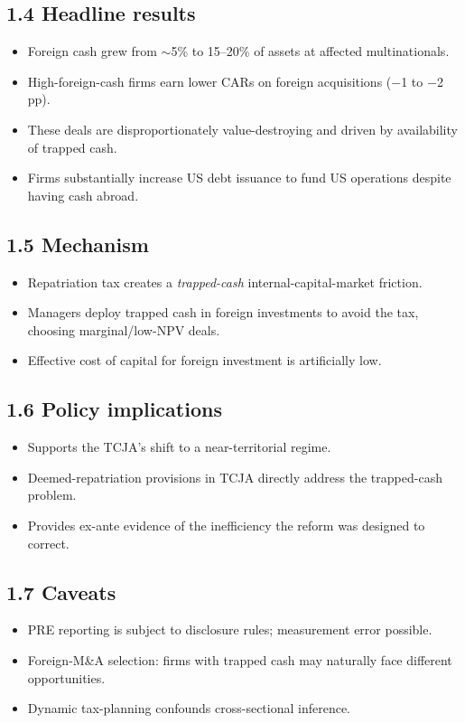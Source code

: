 \documentclass[11pt]{article}
\begin{document}
\subsection*{1.4 Headline results}
\begin{itemize}
\item Foreign cash grew from $\sim$5\% to 15--20\% of assets at affected multinationals.
\item High-foreign-cash firms earn lower CARs on foreign acquisitions ($-$1 to $-$2 pp).
\item These deals are disproportionately value-destroying and driven by availability of trapped cash.
\item Firms substantially increase US debt issuance to fund US operations despite having cash abroad.
\end{itemize}

\subsection*{1.5 Mechanism}
\begin{itemize}
\item Repatriation tax creates a \emph{trapped-cash} internal-capital-market friction.
\item Managers deploy trapped cash in foreign investments to avoid the tax, choosing marginal/low-NPV deals.
\item Effective cost of capital for foreign investment is artificially low.
\end{itemize}

\subsection*{1.6 Policy implications}
\begin{itemize}
\item Supports the TCJA's shift to a near-territorial regime.
\item Deemed-repatriation provisions in TCJA directly address the trapped-cash problem.
\item Provides ex-ante evidence of the inefficiency the reform was designed to correct.
\end{itemize}

\subsection*{1.7 Caveats}
\begin{alertbox}
\begin{itemize}
\item PRE reporting is subject to disclosure rules; measurement error possible.
\item Foreign-M\&A selection: firms with trapped cash may naturally face different opportunities.
\item Dynamic tax-planning confounds cross-sectional inference.
\end{itemize}
\end{alertbox}
\end{document}
